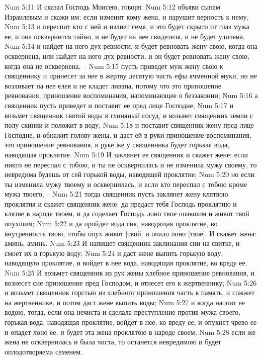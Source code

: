 Num 5:11  И сказал Господь Моисею, говоря:
Num 5:12  объяви сынам Израилевым и скажи им: если изменит кому жена, и нарушит верность к нему,
Num 5:13  и переспит кто с ней и излиет семя, и это будет скрыто от глаз мужа ее, и она осквернится тайно, и не будет на нее свидетеля, и не будет уличена,
Num 5:14  и найдет на него дух ревности, и будет ревновать жену свою, когда она осквернена, или найдет на него дух ревности, и он будет ревновать жену свою, когда она не осквернена, --
Num 5:15  пусть приведет муж жену свою к священнику и принесет за нее в жертву десятую часть ефы ячменной муки, но не возливает на нее елея и не кладет ливана, потому что это приношение ревнования, приношение воспоминания, напоминающее о беззаконии;
Num 5:16  а священник пусть приведет и поставит ее пред лице Господне,
Num 5:17  и возьмет священник святой воды в глиняный сосуд, и возьмет священник земли с полу скинии и положит в воду;
Num 5:18  и поставит священник жену пред лице Господне, и обнажит голову жены, и даст ей в руки приношение воспоминания, --это приношение ревнования, в руке же у священника будет горькая вода, наводящая проклятие.
Num 5:19  И заклянет ее священник и скажет жене: если никто не переспал с тобою, и ты не осквернилась и не изменила мужу своему, то невредима будешь от сей горькой воды, наводящей проклятие;
Num 5:20  но если ты изменила мужу твоему и осквернилась, и если кто переспал с тобою кроме мужа твоего, --
Num 5:21  тогда священник пусть заклянет жену клятвою проклятия и скажет священник жене: да предаст тебя Господь проклятию и клятве в народе твоем, и да соделает Господь лоно твое опавшим и живот твой опухшим;
Num 5:22  и да пройдет вода сия, наводящая проклятие, во внутренность твою, чтобы опух живот [твой] и опало лоно [твое]. И скажет жена: аминь, аминь.
Num 5:23  И напишет священник заклинания сии на свитке, и смоет их в горькую воду;
Num 5:24  и даст жене выпить горькую воду, наводящую проклятие, и войдет в нее вода, наводящая проклятие, ко вреду ее.
Num 5:25  И возьмет священник из рук жены хлебное приношение ревнования, и вознесет сие приношение пред Господом, и отнесет его к жертвеннику;
Num 5:26  и возьмет священник горстью из хлебного приношения часть в память, и сожжет на жертвеннике, и потом даст жене выпить воды;
Num 5:27  и когда напоит ее водою, тогда, если она нечиста и сделала преступление против мужа своего, горькая вода, наводящая проклятие, войдет в нее, ко вреду ее, и опухнет чрево ее и опадет лоно ее, и будет эта жена проклятою в народе своем;
Num 5:28  если же жена не осквернилась и была чиста, то останется невредимою и будет оплодотворяема семенем.
